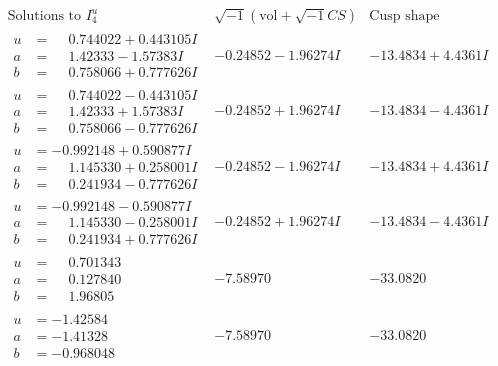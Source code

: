 \documentclass[1p]{elsarticle_modified}
\theoremstyle{definition}
\newcommand{\I}{\sqrt{-1}}
\begin{document}
$$\begin{array}{c|c|c}  
\text{Solutions to }I^u_{4}& \I (\text{vol} + \sqrt{-1}CS) & \text{Cusp shape}\\
 \hline 
\begin{aligned}
u &= \phantom{-}0.744022 + 0.443105 I \\
a &= \phantom{-}1.42333 - 1.57383 I \\
b &= \phantom{-}0.758066 + 0.777626 I\end{aligned}
 & -0.24852 - 1.96274 I & -13.4834 + 4.4361 I \\ \hline\begin{aligned}
u &= \phantom{-}0.744022 - 0.443105 I \\
a &= \phantom{-}1.42333 + 1.57383 I \\
b &= \phantom{-}0.758066 - 0.777626 I\end{aligned}
 & -0.24852 + 1.96274 I & -13.4834 - 4.4361 I \\ \hline\begin{aligned}
u &= -0.992148 + 0.590877 I \\
a &= \phantom{-}1.145330 + 0.258001 I \\
b &= \phantom{-}0.241934 - 0.777626 I\end{aligned}
 & -0.24852 - 1.96274 I & -13.4834 + 4.4361 I \\ \hline\begin{aligned}
u &= -0.992148 - 0.590877 I \\
a &= \phantom{-}1.145330 - 0.258001 I \\
b &= \phantom{-}0.241934 + 0.777626 I\end{aligned}
 & -0.24852 + 1.96274 I & -13.4834 - 4.4361 I \\ \hline\begin{aligned}
u &= \phantom{-}0.701343\phantom{ +0.000000I} \\
a &= \phantom{-}0.127840\phantom{ +0.000000I} \\
b &= \phantom{-}1.96805\phantom{ +0.000000I}\end{aligned}
 & -7.58970\phantom{ +0.000000I} & -33.0820\phantom{ +0.000000I} \\ \hline\begin{aligned}
u &= -1.42584\phantom{ +0.000000I} \\
a &= -1.41328\phantom{ +0.000000I} \\
b &= -0.968048\phantom{ +0.000000I}\end{aligned}
 & -7.58970\phantom{ +0.000000I} & -33.0820\phantom{ +0.000000I} \\ \hline\begin{aligned}

\end{aligned}
\end{array}$$
\end{document}
